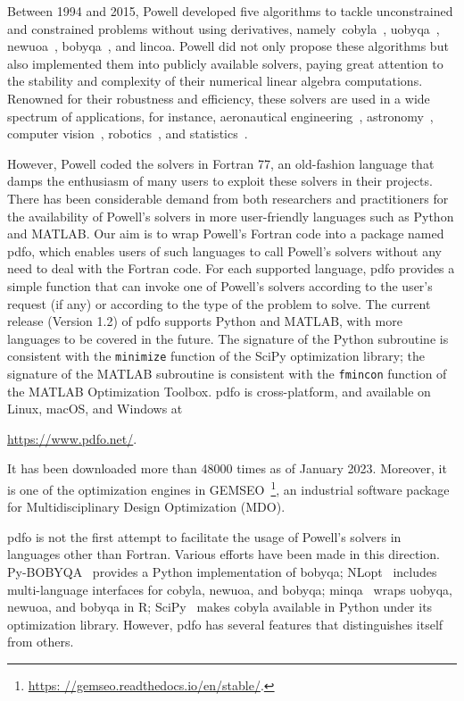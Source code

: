 \documentclass[
    smallextended,  %
    final,        %
]{svjour3}
\begin{document}
Between 1994 and 2015, Powell developed five algorithms to tackle unconstrained and constrained problems without using derivatives, namely~\gls{cobyla}~\cite{Powell_1994}, \gls{uobyqa}~\cite{Powell_2002}, \gls{newuoa}~\cite{Powell_2006}, \gls{bobyqa}~\cite{Powell_2009}, and \gls{lincoa}.
Powell did not only propose these algorithms but also implemented them into publicly available solvers, paying great attention to the stability and complexity of their numerical linear algebra computations.
Renowned for their robustness and efficiency, these solvers are used in a wide spectrum of applications, for instance, aeronautical engineering~\cite{Gallard_Etal_2018}, astronomy~\cite{Biviano_Etal_2013,Mamon_Biviano_Boue_2013}, computer vision~\cite{Izadinia_Shan_Seitz_2017}, robotics~\cite{Mombaur_Truong_Laumond_2010}, and statistics~\cite{Bates_Etal_2015}.

However, Powell coded the solvers in Fortran 77, an old-fashion language that damps the enthusiasm of many users to exploit these solvers in their projects.
There has been considerable demand from both researchers and practitioners for the availability of Powell's solvers in more user-friendly languages such as Python and MATLAB.
Our aim is to wrap Powell's Fortran code into a package named \gls{pdfo}, which enables users of such languages to call Powell's solvers without any need to deal with the Fortran code.
For each supported language, \gls{pdfo} provides a simple function that can invoke one of Powell's solvers according to the user's request (if any) or according to the type of the problem to solve.
The current release (Version 1.2) of \gls{pdfo} supports Python and MATLAB, with more languages to be covered in the future.
The signature of the Python subroutine is consistent with the \texttt{minimize} function of the SciPy optimization library; the signature of the MATLAB subroutine is consistent with the \texttt{fmincon} function of the MATLAB Optimization Toolbox.
\gls{pdfo} is cross-platform, and available on Linux, macOS, and Windows at
\begin{center}
    \url{https://www.pdfo.net/}.
\end{center}
It has been downloaded more than \num{48000} times as of January 2023.
Moreover, it is one of the optimization engines in GEMSEO~\cite{Gallard_Etal_2018}\footnote{\url{https: //gemseo.readthedocs.io/en/stable/}.}, an industrial software package for Multidisciplinary Design Optimization (MDO).

\Gls{pdfo} is not the first attempt to facilitate the usage of Powell's solvers in languages other than Fortran.
Various efforts have been made in this direction.
Py-BOBYQA~\cite{Cartis_Etal_2019,Cartis_Roberts_Sheridan-Methven_2022} provides a Python implementation of \gls{bobyqa}; NLopt~\cite{Johnson_2019} includes multi-language interfaces for \gls{cobyla}, \gls{newuoa}, and \gls{bobyqa}; minqa~\cite{Bates_Etal_2014} wraps \gls{uobyqa}, \gls{newuoa}, and \gls{bobyqa} in R; SciPy~\cite{Virtanen_Etal_2020} makes \gls{cobyla} available in Python under its optimization library.
However, \gls{pdfo} has several features that distinguishes itself from others.
\end{document}
